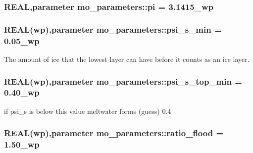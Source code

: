 \hypertarget{namespacemo__parameters_ae2c1c26c67cd8e13b7693bbe2c5b717a}{
\subsubsection[{pi}]{\setlength{\rightskip}{0pt plus 5cm}REAL,parameter {\bf mo\_\-parameters::pi} = 3.1415\_\-wp}}
\label{namespacemo__parameters_ae2c1c26c67cd8e13b7693bbe2c5b717a}
\hypertarget{namespacemo__parameters_a220395b5fd47214fbb07e7e55c635e4f}{
\subsubsection[{psi\_\-s\_\-min}]{\setlength{\rightskip}{0pt plus 5cm}REAL({\bf wp}),parameter {\bf mo\_\-parameters::psi\_\-s\_\-min} = 0.05\_\-wp}}
\label{namespacemo__parameters_a220395b5fd47214fbb07e7e55c635e4f}


The amount of ice that the lowest layer can have before it counts as an ice layer. 

\hypertarget{namespacemo__parameters_aad3c0bd73579bfd1abca40b80ed51334}{
\subsubsection[{psi\_\-s\_\-top\_\-min}]{\setlength{\rightskip}{0pt plus 5cm}REAL({\bf wp}),parameter {\bf mo\_\-parameters::psi\_\-s\_\-top\_\-min} = 0.40\_\-wp}}
\label{namespacemo__parameters_aad3c0bd73579bfd1abca40b80ed51334}


if psi\_\-s is below this value meltwater forms (guess) 0.4 

\hypertarget{namespacemo__parameters_a539e9e515a9154116d2c2f53f4153518}{
\subsubsection[{ratio\_\-flood}]{\setlength{\rightskip}{0pt plus 5cm}REAL({\bf wp}),parameter {\bf mo\_\-parameters::ratio\_\-flood} = 1.50\_\-wp}}
\label{namespacemo__parameters_a539e9e515a9154116d2c2f53f4153518}


